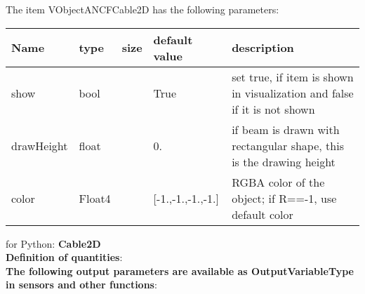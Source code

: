 The item VObjectANCFCable2D has the following parameters:\vspace{-1cm}\\ 
\begin{center}
  \footnotesize
  \begin{longtable}{| p{4.5cm} | p{2.5cm} | p{0.5cm} | p{2.5cm} | p{6cm} |}
    \hline
    \bf Name & \bf type & \bf size & \bf default value & \bf description \\ \hline
    show &     bool &      &     True &     set true, if item is shown in visualization and false if it is not shown\\ \hline
    drawHeight &     float &      &     0. &     if beam is drawn with rectangular shape, this is the drawing height\\ \hline
    color &     Float4 &      &     [-1.,-1.,-1.,-1.] &     RGBA color of the object; if R==-1, use default color\\ \hline
	  \end{longtable}
	\end{center}

 for Python: {\bf Cable2D}
 \vspace{6pt}\\{\bf Definition of quantities}:\\
{\bf The following output parameters are available as OutputVariableType in sensors and other functions}:\\ 
\finishTable
\newpage

